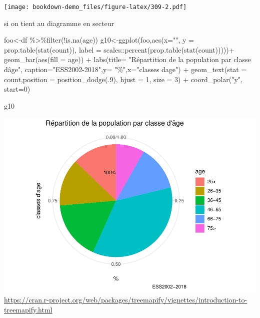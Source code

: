 \documentclass[
]{book}
\newenvironment{Shaded}{\begin{snugshade}}{\end{snugshade}}
\newcommand{\AttributeTok}[1]{\textcolor[rgb]{0.77,0.63,0.00}{#1}}
\newcommand{\DecValTok}[1]{\textcolor[rgb]{0.00,0.00,0.81}{#1}}
\newcommand{\FunctionTok}[1]{\textcolor[rgb]{0.00,0.00,0.00}{#1}}
\newcommand{\NormalTok}[1]{#1}
\newcommand{\OtherTok}[1]{\textcolor[rgb]{0.56,0.35,0.01}{#1}}
\newcommand{\SpecialCharTok}[1]{\textcolor[rgb]{0.00,0.00,0.00}{#1}}
\newcommand{\StringTok}[1]{\textcolor[rgb]{0.31,0.60,0.02}{#1}}
\begin{document}
\texttt{[image: bookdown-demo\_files/figure-latex/309-2.pdf]}

si on tient au diagramme en secteur

\begin{Shaded}
\begin{Highlighting}[]
\NormalTok{foo}\OtherTok{\textless{}{-}}\NormalTok{df }\SpecialCharTok{\%\textgreater{}\%}\FunctionTok{filter}\NormalTok{(}\SpecialCharTok{!}\FunctionTok{is.na}\NormalTok{(age))}
\NormalTok{g10}\OtherTok{\textless{}{-}}\FunctionTok{ggplot}\NormalTok{(foo,}\FunctionTok{aes}\NormalTok{(}\AttributeTok{x=}\StringTok{""}\NormalTok{, }\AttributeTok{y =} \FunctionTok{prop.table}\NormalTok{(}\FunctionTok{stat}\NormalTok{(count)),}
                    \AttributeTok{label =}\NormalTok{ scales}\SpecialCharTok{::}\FunctionTok{percent}\NormalTok{(}\FunctionTok{prop.table}\NormalTok{(}\FunctionTok{stat}\NormalTok{(count)))))}\SpecialCharTok{+}
  \FunctionTok{geom\_bar}\NormalTok{(}\FunctionTok{aes}\NormalTok{(}\AttributeTok{fill =}\NormalTok{ age)) }\SpecialCharTok{+}  
  \FunctionTok{labs}\NormalTok{(}\AttributeTok{title=} \StringTok{"Répartition de la population par classe d\textquotesingle{}âge"}\NormalTok{, }
       \AttributeTok{caption=}\StringTok{"ESS2002{-}2018"}\NormalTok{,}\AttributeTok{y=} \StringTok{"\%"}\NormalTok{,}\AttributeTok{x=}\StringTok{"classes d\textquotesingle{}age"}\NormalTok{) }\SpecialCharTok{+}
  \FunctionTok{geom\_text}\NormalTok{(}\AttributeTok{stat =} \StringTok{\textquotesingle{}count\textquotesingle{}}\NormalTok{,}\AttributeTok{position =} \FunctionTok{position\_dodge}\NormalTok{(.}\DecValTok{9}\NormalTok{),  }\AttributeTok{hjust =} \DecValTok{1}\NormalTok{, }\AttributeTok{size =} \DecValTok{3}\NormalTok{) }\SpecialCharTok{+} 
  \FunctionTok{coord\_polar}\NormalTok{(}\StringTok{"y"}\NormalTok{, }\AttributeTok{start=}\DecValTok{0}\NormalTok{)}

\NormalTok{g10}
\end{Highlighting}
\end{Shaded}

\includegraphics{bookdown-demo_files/figure-latex/310-1.pdf}
\url{https://cran.r-project.org/web/packages/treemapify/vignettes/introduction-to-treemapify.html}
\end{document}
